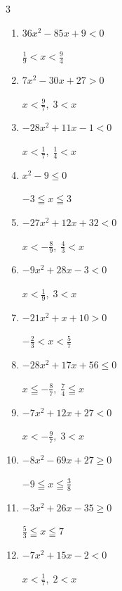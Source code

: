 \begin{multicols}{3}
\begin{enumerate}
        $\displaystyle x < \frac{8}{7} , \; \frac{3}{2} < x$

  \item $36x^{2}-85x+9<0$

        $\displaystyle \frac{1}{9} < x < \frac{9}{4}$

  \item $7x^{2}-30x+27>0$

        $\displaystyle x < \frac{9}{7} , \; 3 < x$

  \item $-28x^{2}+11x-1<0$

        $\displaystyle x < \frac{1}{7} , \; \frac{1}{4} < x$

  \item $x^{2}-9\leq 0$

        $\displaystyle -3 \leqq x \leqq 3$

  \item $-27x^{2}+12x+32<0$

        $\displaystyle x < -\frac{8}{9} , \; \frac{4}{3} < x$

  \item $-9x^{2}+28x-3<0$

        $\displaystyle x < \frac{1}{9} , \; 3 < x$

  \item $-21x^{2}+x+10>0$

        $\displaystyle -\frac{2}{3} < x < \frac{5}{7}$

  \item $-28x^{2}+17x+56\leq 0$

        $\displaystyle x \leqq -\frac{8}{7} , \; \frac{7}{4} \leqq x$

\columnbreak %

  \item $-7x^{2}+12x+27<0$

        $\displaystyle x < -\frac{9}{7} , \; 3 < x$

  \item $-8x^{2}-69x+27\geq 0$

        $\displaystyle -9 \leqq x \leqq \frac{3}{8}$

  \item $-3x^{2}+26x-35\geq 0$

        $\displaystyle \frac{5}{3} \leqq x \leqq 7$

  \item $-7x^{2}+15x-2<0$

        $\displaystyle x < \frac{1}{7} , \; 2 < x$


\end{enumerate}
\end{multicols}
